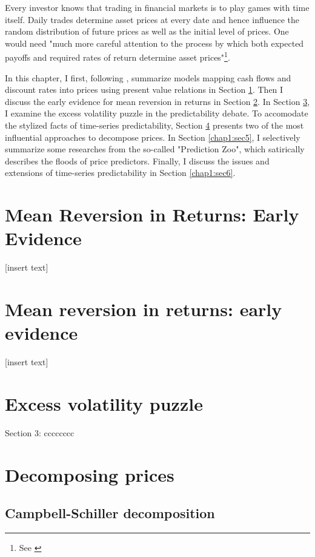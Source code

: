 \minitoc

\vspace{0.5cm}
Every investor knows that trading in financial markets is to play
games with time itself. Daily trades determine asset prices at every date and hence
influence the random distribution of future prices as well as the initial
level of prices. One would need "much more careful attention to the process
by which both expected payoffs and required rates of return determine
asset prices"\footnote{See \citet[p.~121]{campbell2017financial}}.

In this chapter, I first, following \citet[Chapter~5]{campbell2017financial}, summarize models 
mapping cash flows and discount rates into prices using present value relations in Section \ref{chap1:sec1}.
Then I discuss the early evidence for mean reversion in returns in Section \ref{chap1:sec2}.
In Section \ref{chap1:sec3}, I examine the excess volatility puzzle in the predictability debate.
To accomodate the stylized facts of time-series predictability, Section \ref{chap1:sec4}
presents two of the most influential approaches to decompose prices. In Section \ref{chap1:sec5},
I selectively summarize some researches from the so-called "Prediction Zoo", which satirically 
describes the floods of price predictors. Finally, I discuss the issues and extensions of time-series
predictability in Section \ref{chap1:sec6}.


\section{Mean Reversion in Returns: Early Evidence}\label{chap1:sec1}
[insert text]

\section{Mean reversion in returns: early evidence}\label{chap1:sec2}
[insert text]

\section{Excess volatility puzzle}\label{chap1:sec3}
Section 3: cccccccc

\section{Decomposing prices}\label{chap1:sec4}
\subsection{Campbell-Schiller decomposition}\label{chap1:sec4:ssec1}
